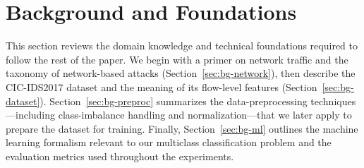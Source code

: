 \section{Background and Foundations}
\label{sec:background}

This section reviews the domain knowledge and technical foundations required to follow the rest of the paper. We begin with a primer on network traffic and the taxonomy of network-based attacks (Section~\ref{sec:bg-network}), then describe the CIC-IDS2017 dataset and the meaning of its flow-level features (Section~\ref{sec:bg-dataset}). Section~\ref{sec:bg-preproc} summarizes the data-preprocessing techniques---including class-imbalance handling and normalization---that we later apply to prepare the dataset for training. Finally, Section~\ref{sec:bg-ml} outlines the machine learning formalism relevant to our multiclass classification problem and the evaluation metrics used throughout the experiments.





